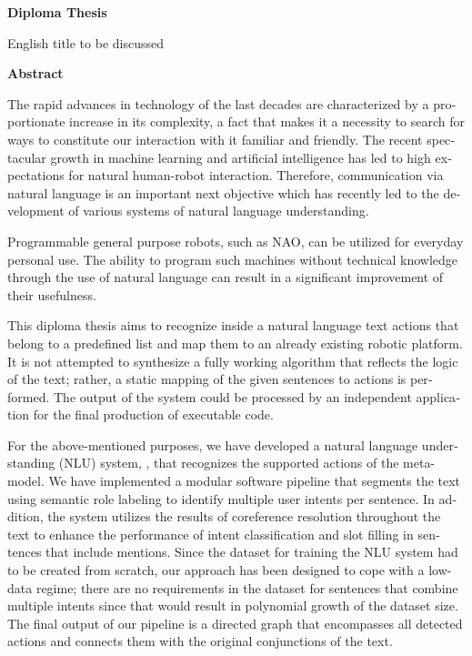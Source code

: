 \begin{english}
{}

\begin{center}
    \centering
    \textbf{\Large{Diploma Thesis}}

    \vspace{0.3cm}
    \large{English title to be discussed}

    \vspace{0.1cm}
    \centering
    \textbf{Abstract}
\end{center}

The rapid advances in technology of the last decades are characterized by a proportionate increase in its complexity, a fact that makes it a necessity to search for ways to constitute our interaction with it familiar and friendly.
The recent spectacular growth in machine learning and artificial intelligence has led to high expectations for natural human-robot interaction.
Therefore, communication via natural language is an important next objective which has recently led to the development of various systems of natural language understanding.

Programmable general purpose robots, such as NAO, can be utilized for everyday personal use.
The ability to program such machines without technical knowledge through the use of natural language can result in a significant improvement of their usefulness.

This diploma thesis aims to recognize inside a natural language text actions that belong to a predefined list and map them to an already existing robotic platform.
It is not attempted to synthesize a fully working algorithm that reflects the logic of the text; rather, a static mapping of the given sentences to actions is performed.
The output of the system could be processed by an independent application for the final production of executable code.

For the above-mentioned purposes, we have developed a natural language understanding (NLU) system, \projectname{}, that recognizes the supported actions of the \metamodel{} meta-model.
We have implemented a modular software pipeline that segments the text using semantic role labeling to identify multiple user intents per sentence.
In addition, the system utilizes the results of coreference resolution throughout the text to enhance the performance of intent classification and slot filling in sentences that include mentions.
Since the dataset for training the NLU system had to be created from scratch, our approach has been designed to cope with a low-data regime;
there are no requirements in the dataset for sentences that combine multiple intents since that would result in polynomial growth of the dataset size.
The final output of our pipeline is a directed graph that encompasses all detected actions and connects them with the original conjunctions of the text.


\end{english}
